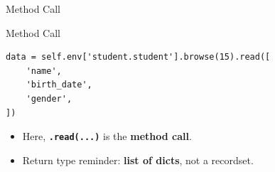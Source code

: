 \begin{frame}[fragile]{Method Call}
\begin{block}{Method Call}
\begin{lstlisting}
data = self.env['student.student'].browse(15).read([
	'name',
	'birth_date',
	'gender',
])
\end{lstlisting}
	\begin{itemize}
		\item Here, \textbf{\texttt{.read(...)}} is the \textbf{method call}.
		\item Return type reminder: \textbf{list of dicts}, not a recordset.
	\end{itemize}
\end{block}
\end{frame}

